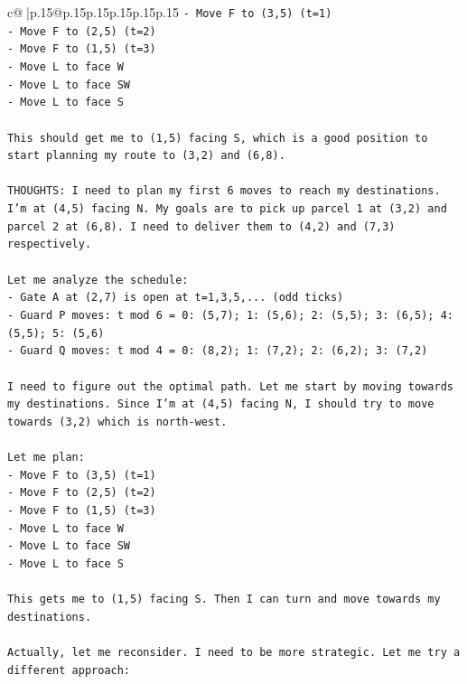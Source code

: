 \documentclass{article}
\begin{document}
{\begin{supertabular}{c@{$\;$}|p{.15\linewidth}@{}p{.15\linewidth}p{.15\linewidth}p{.15\linewidth}p{.15\linewidth}p{.15\linewidth}}
{{{\texttt{{-} Move F to (3,5) (t=1)} \\
\texttt{{-} Move F to (2,5) (t=2)} \\
\texttt{{-} Move F to (1,5) (t=3)} \\
\texttt{{-} Move L to face W} \\
\texttt{{-} Move L to face SW} \\
\texttt{{-} Move L to face S} \\
\\ 
\texttt{This should get me to (1,5) facing S, which is a good position to start planning my route to (3,2) and (6,8).} \\
\\ 
\texttt{THOUGHTS: I need to plan my first 6 moves to reach my destinations. I'm at (4,5) facing N. My goals are to pick up parcel 1 at (3,2) and parcel 2 at (6,8). I need to deliver them to (4,2) and (7,3) respectively.} \\
\\ 
\texttt{Let me analyze the schedule:} \\
\texttt{{-} Gate A at (2,7) is open at t=1,3,5,... (odd ticks)} \\
\texttt{{-} Guard P moves: t mod 6 = 0: (5,7); 1: (5,6); 2: (5,5); 3: (6,5); 4: (5,5); 5: (5,6)} \\
\texttt{{-} Guard Q moves: t mod 4 = 0: (8,2); 1: (7,2); 2: (6,2); 3: (7,2)} \\
\\ 
\texttt{I need to figure out the optimal path. Let me start by moving towards my destinations. Since I'm at (4,5) facing N, I should try to move towards (3,2) which is north{-}west.} \\
\\ 
\texttt{Let me plan:} \\
\texttt{{-} Move F to (3,5) (t=1)} \\
\texttt{{-} Move F to (2,5) (t=2)} \\
\texttt{{-} Move F to (1,5) (t=3)} \\
\texttt{{-} Move L to face W} \\
\texttt{{-} Move L to face SW} \\
\texttt{{-} Move L to face S} \\
\\ 
\texttt{This gets me to (1,5) facing S. Then I can turn and move towards my destinations.} \\
\\ 
\texttt{Actually, let me reconsider. I need to be more strategic. Let me try a different approach:} \\
}}}
\end{supertabular}}
\end{document}
